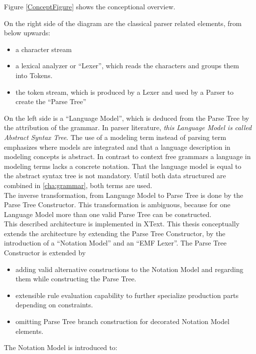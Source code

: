 Figure \ref{ConceptFigure} shows the conceptional overview. 

On the right side of the diagram are the classical parser related elements, from below upwards:
\begin{itemize}
	\item a character stream
	\item a lexical analyzer or ``Lexer'', which reads the characters and groups them into Tokens.
	\item the token stream, which is produced by a Lexer and used by a Parser to create the ``Parse Tree''
\end{itemize}

On the left side is a ``Language Model'', which is deduced from the Parse Tree by the attribution of the grammar. In parser literature, \emph{this Language Model is called Abstract Syntax Tree}. The use of a modeling term instead of parsing term emphasizes where models are integrated and that a language description in modeling concepts is abstract. In contrast to context free grammars a language in modeling terms lacks a concrete notation. That the language model is equal to the abstract syntax tree is not mandatory. Until both data structured are combined in \ref{cha:grammar}, both terms are used. \\
The inverse transformation, from Language Model to Parse Tree is done by the Parse Tree Constructor. This transformation is ambiguous, because for one Language Model more than one valid Parse Tree can be constructed. \\
This described architecture is implemented in XText. This thesis conceptually extends the architecture by extending the Parse Tree Constructor, by the introduction of a ``Notation Model'' and an ``EMF Lexer''.
The Parse Tree Constructor is extended by 
\begin{itemize}
	\item adding valid alternative constructions to the Notation Model and regarding them while constructing the Parse Tree. 
	\item extensible rule evaluation capability to further specialize production parts depending on constraints.
	\item omitting Parse Tree branch construction for decorated Notation Model elements.
\end{itemize}
The Notation Model is introduced to:
